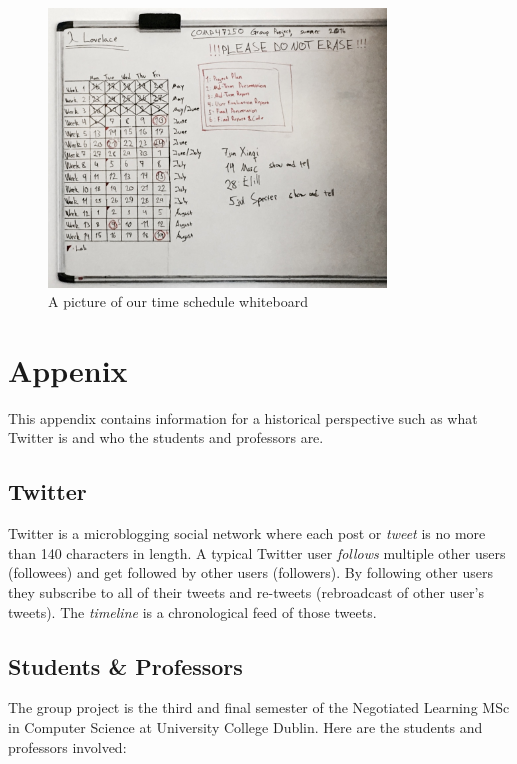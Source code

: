 \documentclass{article}
\begin{document}
\begin{figure}[H]
    \centering
    \includegraphics[width=0.8\textwidth]{whiteboard}    
    \caption{A picture of our time schedule whiteboard}
\end{figure}


\newpage


\section{Appenix}
This appendix contains information for a historical perspective such as what Twitter is and who the students and professors are. 

\subsection{Twitter}
Twitter is a microblogging social network where each post or \textit{tweet} is no more than 140 characters in length. A typical Twitter user \textit{follows} multiple other users (followees) and get followed by other users (followers). By following other users they subscribe to all of their tweets and re-tweets (rebroadcast of other user's tweets). The \textit{timeline} is a chronological feed of those tweets.

\subsection{Students \& Professors}
The group project is the third and final semester of the Negotiated Learning MSc in Computer Science at University College Dublin. Here are the students and professors involved:
\end{document}
